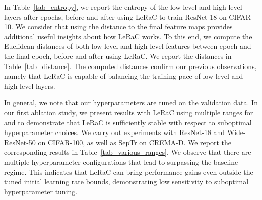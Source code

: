 \documentclass[10pt,twocolumn,letterpaper]{article}
\begin{document}
In Table~\ref{tab_entropy}, we report the entropy of the low-level and high-level layers after  epochs, before and after using LeRaC to train ResNet-18 on CIFAR-10. We consider that using the distance to the final feature maps provides additional useful insights about how LeRaC works. To this end, we compute the Euclidean distances of both low-level and high-level features between epoch  and the final epoch, before and after using LeRaC. We report the distances in Table~\ref{tab_distance}. The computed distances confirm our previous observations, namely that LeRaC is capable of balancing the training pace of low-level and high-level layers.

In general, we note that our hyperparameters are tuned on the validation data. In our first ablation study, we present results with LeRaC using multiple ranges for  and  to demonstrate that LeRaC is sufficiently stable with respect to suboptimal hyperparameter choices. We carry out experiments with ResNet-18 and Wide-ResNet-50 on CIFAR-100, as well as SepTr on CREMA-D. We report the corresponding results in Table~\ref{tab_various_ranges}. We observe that there are multiple hyperparameter configurations that lead to surpassing the baseline regime. This indicates that LeRaC can bring performance gains even outside the tuned initial learning rate bounds, demonstrating low sensitivity to suboptimal hyperparameter tuning.
\end{document}
